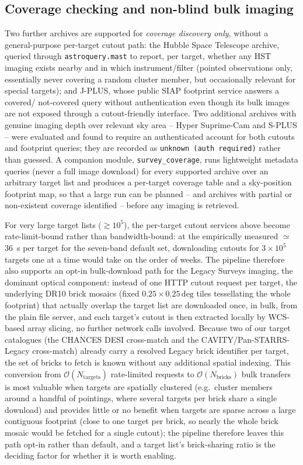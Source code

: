 \documentclass{aa}
\begin{document}
\subsection{Coverage checking and non-blind bulk imaging}
\label{sec:coverage}

Two further archives are supported for \emph{coverage discovery only},
without a general-purpose per-target cutout path: the Hubble Space
Telescope archive, queried through \texttt{astroquery.mast} to report,
per target, whether any HST imaging exists nearby and in which
instrument/filter (pointed observations only, essentially never covering
a random cluster member, but occasionally relevant for special targets);
and J-PLUS, whose public SIAP footprint service answers a covered/
not-covered query without authentication even though its bulk images are
not exposed through a cutout-friendly interface. Two additional archives
with genuine imaging depth over relevant sky area -- Hyper Suprime-Cam
and S-PLUS -- were evaluated and found to require an authenticated
account for both cutouts and footprint queries; they are recorded as
\texttt{unknown (auth required)} rather than guessed. A companion module,
\texttt{survey\_coverage}, runs lightweight metadata queries (never a
full image download) for every supported archive over an arbitrary
target list and produces a per-target coverage table and a sky-position
footprint map, so that a large run can be planned -- and archives with
partial or non-existent coverage identified -- before any imaging is
retrieved.

For very large target lists ($\gtrsim10^5$), the per-target cutout
services above become rate-limit-bound rather than bandwidth-bound: at
the empirically measured $\simeq$36~s per target for the seven-band
default set, downloading cutouts for $3\times10^5$ targets one at a time
would take on the order of weeks. The pipeline therefore also supports an
opt-in bulk-download path for the Legacy Surveys imaging, the dominant
optical component: instead of one HTTP cutout request per target, the
underlying DR10 brick mosaics (fixed $0.25\times0.25\,\mathrm{deg}$
tiles tessellating the whole footprint) that actually overlap the target
list are downloaded once, in bulk, from the plain file server, and each
target's cutout is then extracted locally by WCS-based array slicing, no
further network calls involved. Because two of our target catalogues
(the CHANCES DESI cross-match and the CAVITY/Pan-STARRS-Legacy
cross-match) already carry a resolved Legacy brick identifier per
target, the set of bricks to fetch is known without any additional
spatial indexing. This conversion from $\mathcal{O}(N_\mathrm{targets})$
rate-limited requests to $\mathcal{O}(N_\mathrm{bricks})$ bulk transfers
is most valuable when targets are spatially clustered (e.g.\ cluster
members around a handful of pointings, where several targets per brick
share a single download) and provides little or no benefit when targets
are sparse across a large contiguous footprint (close to one target per
brick, so nearly the whole brick mosaic would be fetched for a single
cutout); the pipeline therefore leaves this path opt-in rather than
default, and a target list's brick-sharing ratio is the deciding factor
for whether it is worth enabling.
\end{document}
